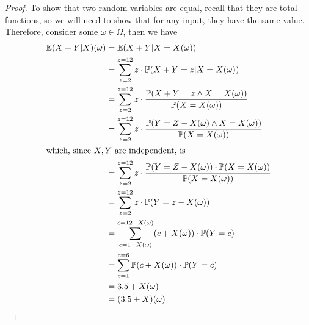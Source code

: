 	\begin{proof}
	To show that two random variables are equal, recall that they are total functions, so
	we will need to show that for any input, they have the same value. Therefore, consider some 
	$\omega \in \Omega$, then we have
	\begin{align*}
		\mathbb{E}(X+Y|X)(\omega) &= \mathbb{E}(X+Y|X=X(\omega)) \\
		&= \sum_{z=2}^{z=12} z\cdot \mathbb{P}(X+Y=z | X=X(\omega)) \\
		&= \sum_{z=2}^{z=12} z \cdot 
		\frac{\mathbb{P}(X+Y=z \land X = X(\omega))}{\mathbb{P}(X=X(\omega))} \\
		&= \sum_{z=2}^{z=12} z \cdot 
		\frac{\mathbb{P}(Y=Z-X(\omega) \land X = X(\omega))}{\mathbb{P}(X=X(\omega))} \\
		\intertext{which, since $X,Y$ are independent, is}
		&= \sum_{z=2}^{z=12} z \cdot \frac{\mathbb{P}(Y=Z-X(\omega))\cdot 
		\mathbb{P}(X = X(\omega))}{\mathbb{P}(X=X(\omega))} \\
		&= \sum_{z=2}^{z=12} z \cdot \mathbb{P}(Y=z-X(\omega)) \\
		&= \sum_{c = 1 - X(\omega)}^{c=12-X(\omega)} (c+X(\omega)) \cdot\mathbb{P}(Y=c) \\
		&= \sum_{c = 1}^{c=6} \mathbb{P}(c+X(\omega)) \cdot \mathbb{P}(Y=c) \\
		&= 3.5 + X(\omega) \\
		&= (3.5 + X)(\omega)
	\end{align*}
	\end{proof}


